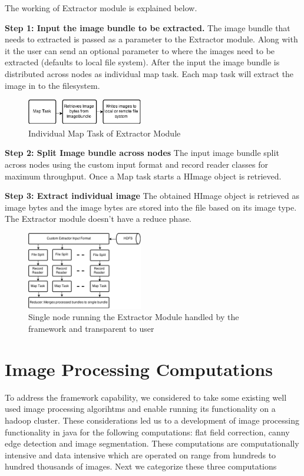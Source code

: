 \documentclass[conference]{IEEEtran}
\begin{document}
The working of Extractor module is explained below.

\textbf{Step 1: Input the image bundle to be extracted.} The image bundle that needs to extracted is passed as a parameter to the Extractor module. Along with it the user can send an optional parameter to where the images need to be extracted (defaults to local file system). After the input the image bundle is distributed across nodes as individual map task. Each map task will extract the image in to the filesystem.     

\begin{figure}[h]
	\centering
	\includegraphics[width=0.45\textwidth]{ext-map}
	\caption{Individual Map Task of Extractor Module}
	\label{fig:ext-map}
\end{figure}


\textbf{Step 2: Split Image bundle across nodes}
The input image bundle split across nodes using the custom input format and record reader classes for maximum throughput. Once a Map task starts a HImage object is retrieved.

\textbf{Step 3: Extract individual image}
The obtained HImage object is retrieved as image bytes and the image bytes are stored into the file based on its image type. The Extractor module doesn't have a reduce phase.

\begin{figure}[h]
	\centering
	\includegraphics[width=0.45\textwidth]{ext-node}
	\caption{Single node running the Extractor Module handled by the framework and transparent to user}
	\label{fig:ext-node}
\end{figure}


\section{Image Processing Computations}
To address the framework capability, we considered to take some existing well used image processing algorihtms and enable running its functionality on a hadoop cluster. These considerations led us to a development of image processing functionality in java for the following computations: flat field correction, canny edge detection and image segmentation. These computations are computationally intensive and data intensive which are operated on range from hundreds to hundred thousands of images. Next we categorize these three computations
\end{document}
